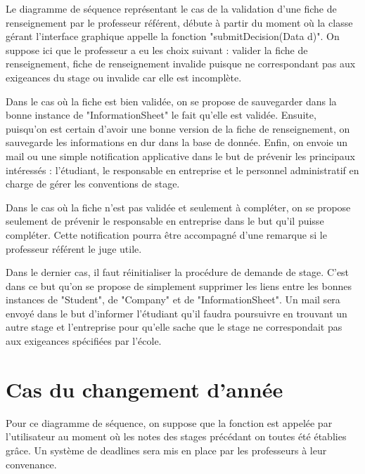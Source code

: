 \documentclass{scrreprt}
\begin{document}
	Le diagramme de séquence représentant le cas de la validation d'une fiche de renseignement par le professeur référent, débute 
à partir du moment où la classe gérant l'interface graphique appelle la fonction "submitDecision(Data d)". On suppose ici que 
le professeur a eu les choix suivant : valider la fiche de renseignement, fiche de renseignement invalide puisque ne correspondant 
pas aux exigeances du stage ou invalide car elle est incomplète. 

	Dans le cas où la fiche est bien validée, on se propose de sauvegarder dans la bonne instance de "InformationSheet" le fait qu'elle est 
validée. Ensuite, puisqu'on est certain d'avoir une bonne version de la fiche de renseignement, on sauvegarde les informations en dur 
dans la base de donnée. Enfin, on envoie un mail ou une simple notification applicative dans le but de prévenir les principaux intéressés :
l'étudiant, le responsable en entreprise et le personnel administratif en charge de gérer les conventions de stage.

	Dans le cas où la fiche n'est pas validée et seulement à compléter, on se propose seulement de prévenir le responsable en entreprise dans 
le but qu'il puisse compléter. Cette notification pourra être accompagné d'une remarque si le professeur référent le juge utile. 

	Dans le dernier cas, il faut réinitialiser la procédure de demande de stage. C'est dans ce but qu'on se propose de simplement supprimer 
les liens entre les bonnes instances de "Student", de "Company" et de "InformationSheet". Un mail sera envoyé dans le but d'informer l'étudiant
qu'il faudra poursuivre en trouvant un autre stage et l'entreprise pour qu'elle sache que le stage ne correspondait pas aux exigeances spécifiées
par l'école. 

\newpage

\newpage
\section{Cas du changement d'année}

	Pour ce diagramme de séquence, on suppose que la fonction est appelée par l'utilisateur au moment où les notes des stages
précédant on toutes été établies grâce. Un système de deadlines sera mis en place par les professeurs à leur convenance. 
\end{document}
